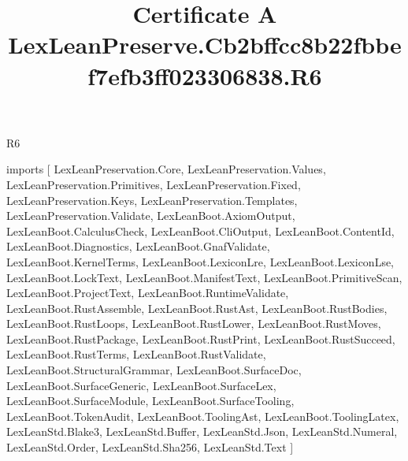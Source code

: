 \begin{lexlean}{R6}
\title{Certificate A LexLeanPreserve.Cb2bffcc8b22fbbef7efb3ff023306838.R6}
\begin{coremodule}
imports [
  LexLeanPreservation.Core,
  LexLeanPreservation.Values,
  LexLeanPreservation.Primitives,
  LexLeanPreservation.Fixed,
  LexLeanPreservation.Keys,
  LexLeanPreservation.Templates,
  LexLeanPreservation.Validate,
  LexLeanBoot.AxiomOutput,
  LexLeanBoot.CalculusCheck,
  LexLeanBoot.CliOutput,
  LexLeanBoot.ContentId,
  LexLeanBoot.Diagnostics,
  LexLeanBoot.GnafValidate,
  LexLeanBoot.KernelTerms,
  LexLeanBoot.LexiconLre,
  LexLeanBoot.LexiconLse,
  LexLeanBoot.LockText,
  LexLeanBoot.ManifestText,
  LexLeanBoot.PrimitiveScan,
  LexLeanBoot.ProjectText,
  LexLeanBoot.RuntimeValidate,
  LexLeanBoot.RustAssemble,
  LexLeanBoot.RustAst,
  LexLeanBoot.RustBodies,
  LexLeanBoot.RustLoops,
  LexLeanBoot.RustLower,
  LexLeanBoot.RustMoves,
  LexLeanBoot.RustPackage,
  LexLeanBoot.RustPrint,
  LexLeanBoot.RustSucceed,
  LexLeanBoot.RustTerms,
  LexLeanBoot.RustValidate,
  LexLeanBoot.StructuralGrammar,
  LexLeanBoot.SurfaceDoc,
  LexLeanBoot.SurfaceGeneric,
  LexLeanBoot.SurfaceLex,
  LexLeanBoot.SurfaceModule,
  LexLeanBoot.SurfaceTooling,
  LexLeanBoot.TokenAudit,
  LexLeanBoot.ToolingAst,
  LexLeanBoot.ToolingLatex,
  LexLeanStd.Blake3,
  LexLeanStd.Buffer,
  LexLeanStd.Json,
  LexLeanStd.Numeral,
  LexLeanStd.Order,
  LexLeanStd.Sha256,
  LexLeanStd.Text
]


\end{coremodule}
\end{lexlean}
